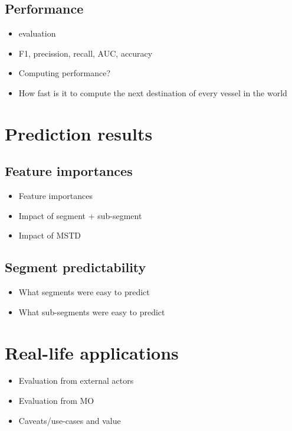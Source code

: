 \subsection{Performance}

\begin{itemize}
    \item evaluation
    \item F1, precission, recall, AUC, accuracy
    \item Computing performance?
    \item How fast is it to compute the next destination of every vessel in the world
\end{itemize}

\section{Prediction results}

\subsection{Feature importances}

\begin{itemize}
    \item Feature importances
    \item Impact of segment + sub-segment
    \item Impact of MSTD
\end{itemize}

\subsection{Segment predictability}

\begin{itemize}
    \item What segments were easy to predict
    \item What sub-segments were easy to predict
\end{itemize}

\section{Real-life applications}

\begin{itemize}
    \item Evaluation from external actors
    \item Evaluation from MO
    \item Caveats/use-cases and value
\end{itemize}
